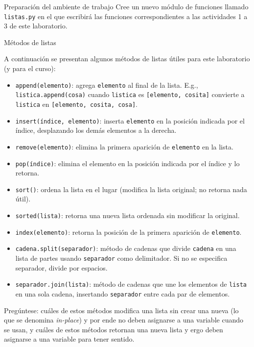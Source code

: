 \documentclass{ip-lab}
\begin{document}
\maketitle

\begin{sectionbox}{Preparación del ambiente de trabajo}
Cree un nuevo módulo de funciones llamado \texttt{listas.py} en el que escribirá las funciones correspondientes a las actividades 1 a 3 de este laboratorio.
\end{sectionbox}


\begin{sectionbox}{Métodos de listas}

A continuación se presentan algunos métodos de listas útiles para este laboratorio (y para el curso):

\begin{itemize}
    \item \texttt{append(elemento)}: agrega \texttt{elemento} al final de la lista. E.g., \texttt{listica.append(\textquotedbl cosa\textquotedbl)} cuando \texttt{listica} es \texttt{[\textquotedbl elemento\textquotedbl, \textquotedbl cosita\textquotedbl]} convierte a \texttt{listica} en \texttt{[\textquotedbl elemento\textquotedbl, \textquotedbl cosita\textquotedbl, \textquotedbl cosa\textquotedbl]}.
    \item \texttt{insert(índice, elemento)}: inserta \texttt{elemento} en la posición indicada por el índice, desplazando los demás elementos a la derecha.
    \item \texttt{remove(elemento)}: elimina la primera aparición de \texttt{elemento} en la lista.
    \item \texttt{pop(índice)}: elimina el elemento en la posición indicada por el índice y lo retorna.
    \item \texttt{sort()}: ordena la lista en el lugar (modifica la lista original; no retorna nada útil).
    \item \texttt{sorted(lista)}: retorna una nueva lista ordenada sin modificar la original.
    \item \texttt{index(elemento)}: retorna la posición de la primera aparición de \texttt{elemento}.
    \item \texttt{cadena.split(separador)}: método de cadenas que divide \texttt{cadena} en una lista de partes usando \texttt{separador} como delimitador. Si no se especifica separador, divide por espacios.
    \item \texttt{separador.join(lista)}: método de cadenas que une los elementos de \texttt{lista} en una sola cadena, insertando \texttt{separador} entre cada par de elementos.
\end{itemize}

Pregúntese: cuáles de estos métodos modifica una lista sin crear una nueva (lo que se denomina \textit{in-place}) y por ende no deben asignarse a una variable cuando se usan, y cuáles de estos métodos retornan una nueva lista y ergo deben asignarse a una variable para tener sentido. 

\end{sectionbox}
\end{document}
